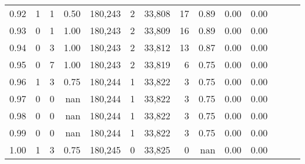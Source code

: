 \begin{tabular}{rrrrrrrrrrrrrr}
0.92 &      1 &    1 &  0.50 &  180,243 &        2 &  33,808 &      17 &  0.89 &  0.00 &      0.00 \\
0.93 &      0 &    1 &  1.00 &  180,243 &        2 &  33,809 &      16 &  0.89 &  0.00 &      0.00 \\
0.94 &      0 &    3 &  1.00 &  180,243 &        2 &  33,812 &      13 &  0.87 &  0.00 &      0.00 \\
0.95 &      0 &    7 &  1.00 &  180,243 &        2 &  33,819 &       6 &  0.75 &  0.00 &      0.00 \\
0.96 &      1 &    3 &  0.75 &  180,244 &        1 &  33,822 &       3 &  0.75 &  0.00 &      0.00 \\
0.97 &      0 &    0 &   nan &  180,244 &        1 &  33,822 &       3 &  0.75 &  0.00 &      0.00 \\
0.98 &      0 &    0 &   nan &  180,244 &        1 &  33,822 &       3 &  0.75 &  0.00 &      0.00 \\
0.99 &      0 &    0 &   nan &  180,244 &        1 &  33,822 &       3 &  0.75 &  0.00 &      0.00 \\
1.00 &      1 &    3 &  0.75 &  180,245 &        0 &  33,825 &       0 &   nan &  0.00 &      0.00 \\
\bottomrule
\end{tabular}
